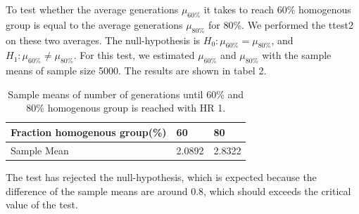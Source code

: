To test whether the average generations $\mu_{60\%}$ it takes to reach 60\% homogenous group is equal to the average generations $\mu_{80\%}$ for 80\%. We performed the ttest2 on these two averages. The null-hypothesis is $H_0:\mu_{60\%}=\mu_{80\%}$, and $H_1: \mu_{60\%}\neq \mu_{80\%}$. For this test, we estimated $\mu_{60\%}$ and $\mu_{80\%}$ with the sample means of sample size 5000. The results are shown in tabel 2.
\begin{table}[htp]
\centering
\caption{Sample means of number of generations until 60\% and 80\% homogenous group is reached with HR 1.}
\begin{tabular}{|l|l|l|}
\hline
 Fraction homogenous group(\%)&60&80 \\ \hline
 Sample Mean&2.0892&2.8322  \\ \hline 
\end{tabular}
\end{table}
The test has rejected the null-hypothesis, which is expected because the difference of the sample means are around 0.8, which should exceeds the critical value of the test.
